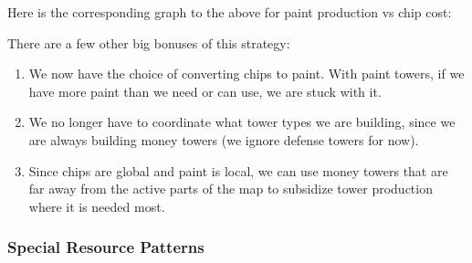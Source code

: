 \documentclass{article}
\begin{document}
  \medskip

  Here is the corresponding graph to the above for paint production vs chip cost:
  \begin{center}
  \end{center}
  There are a few other big bonuses of this strategy:
  \begin{enumerate}
    \item We now have the choice of converting chips to paint. With paint towers, if we have more paint than we need or can use, we are stuck with it.
    \item We no longer have to coordinate what tower types we are building, since we are always building money towers (we ignore defense towers for now).
    \item Since chips are global and paint is local, we can use money towers that are far away from the active parts of the map to subsidize tower production where it is needed most.
  \end{enumerate}

  \subsubsection{Special Resource Patterns}
\end{document}

